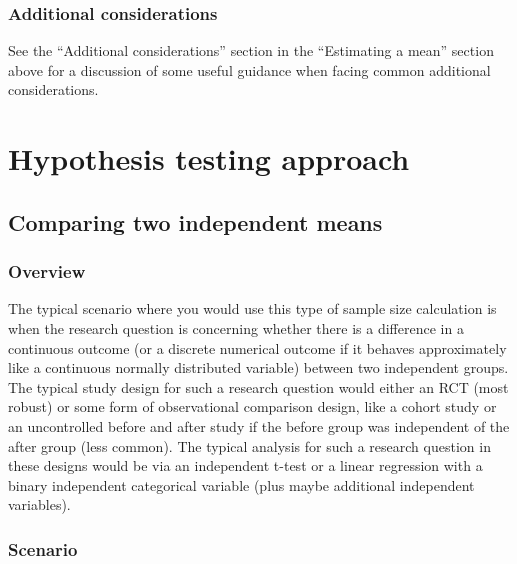 \documentclass[
]{book}
\begin{document}
\hypertarget{additional-considerations-1}{%
\subsubsection{Additional considerations}\label{additional-considerations-1}}

See the ``Additional considerations'' section in the ``Estimating a mean'' section above for a discussion of some useful guidance when facing common additional considerations.

\hypertarget{hypothesis-testing-approach}{%
\section{Hypothesis testing approach}\label{hypothesis-testing-approach}}

\hypertarget{comparing-two-independent-means}{%
\subsection{Comparing two independent means}\label{comparing-two-independent-means}}

\hypertarget{overview-7}{%
\subsubsection{Overview}\label{overview-7}}

The typical scenario where you would use this type of sample size calculation is when the research question is concerning whether there is a difference in a continuous outcome (or a discrete numerical outcome if it behaves approximately like a continuous normally distributed variable) between two independent groups. The typical study design for such a research question would either an RCT (most robust) or some form of observational comparison design, like a cohort study or an uncontrolled before and after study if the before group was independent of the after group (less common). The typical analysis for such a research question in these designs would be via an independent t-test or a linear regression with a binary independent categorical variable (plus maybe additional independent variables).

\hypertarget{scenario-5}{%
\subsubsection{Scenario}\label{scenario-5}}
\end{document}
